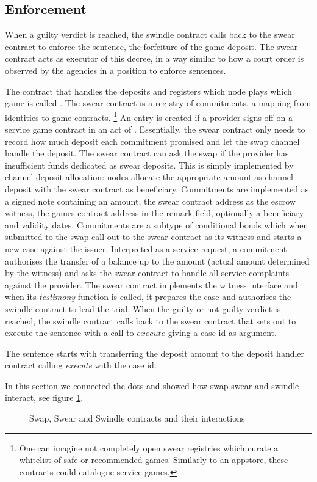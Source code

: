 \subsection{Enforcement}

When a guilty verdict is reached, the swindle contract calls back to the swear contract to enforce the sentence, the forfeiture of the game deposit. The swear contract acts as executor of this decree, in a way similar to how a court order is observed by the agencies in a position to enforce sentences.  

The contract that handles the deposits and registers which node plays which game is called .
The swear contract is a registry of commitments, a mapping from identities to game contracts.%
%
\footnote{One can imagine not completely open swear registries which curate a whitelist of safe or recommended games. Similarly to an appstore, these contracts could catalogue service games.}
%
An entry is created if a provider signs off on a service game contract in an act of . Essentially, the swear contract only needs to record how much deposit each commitment promised and let the swap channel handle the deposit.
The swear contract can  ask the swap if the provider has insufficient funds dedicated as swear deposits. This is simply implemented by channel deposit allocation: nodes allocate the appropriate amount as channel deposit with the swear contract as beneficiary.
Commitments are implemented as a signed note containing an amount, the swear contract address as the escrow witness, the games contract address in the remark field, optionally a beneficiary and validity dates. Commitments are a subtype of conditional bonds which when submitted to the swap call out to the swear contract as its witness and starts a new case against the issuer. 
Interpreted as a service request, a commitment authorises the transfer of a balance up to the amount (actual amount determined by the witness) and asks the swear contract to handle all service complaints against the provider. The swear contract implements the witness interface and when its \emph{testimony} function is called, it prepares the case and authorises the swindle contract to lead the trial. When the guilty or not-guilty verdict is reached, the swindle contract calls back to the swear contract that sets out to execute the sentence with a call to $execute$ giving a case id as argument.

The sentence starts with transferring the deposit amount to the deposit handler contract calling \emph{execute} with the case id.


In this section we connected the dots and showed how swap swear and swindle interact, see figure \ref{fig:sw3}.

\begin{center}
\begin{figure}
\begin{center}
\begin{tikzpicture}
\end{tikzpicture}
\end{center}
\caption{Swap, Swear and Swindle contracts and their interactions}
\label{fig:sw3}
\end{figure}
\end{center}